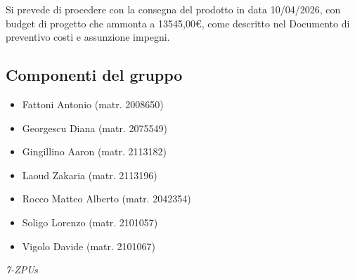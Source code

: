 \documentclass[a4paper,12pt]{article}
\begin{document}
Si prevede di procedere con la consegna del prodotto in data 10/04/2026, con budget di progetto che ammonta a 13545,00€, come descritto nel Documento di preventivo costi e assunzione impegni.

\subsection*{Componenti del gruppo}
\begin{itemize}[noitemsep]
    \item Fattoni Antonio (matr. 2008650)
    \item Georgescu Diana (matr. 2075549)
    \item Gingillino Aaron (matr. 2113182)
    \item Laoud Zakaria (matr. 2113196)
    \item Rocco Matteo Alberto (matr. 2042354)
    \item Soligo Lorenzo (matr. 2101057)
    \item Vigolo Davide (matr. 2101067)
\end{itemize}



\vfill
\begin{flushright}
    \textit{7-ZPUs}
\end{flushright}
\end{document}
